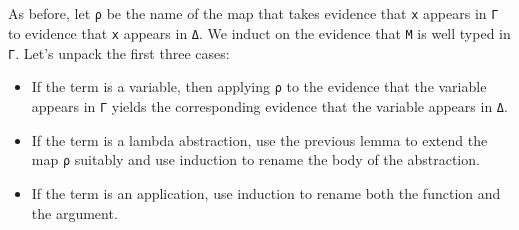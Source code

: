 \begin{fence}
\begin{code}
\>[27]\AgdaSymbol{=}%
\>[30]\AgdaSymbol{(}\AgdaSpace{}%
\AgdaSpace{}%
\AgdaSymbol{)}\AgdaSpace{}%
\AgdaSpace{}%
\AgdaSymbol{(}\AgdaSpace{}%
\AgdaSpace{}%
\AgdaSymbol{)}\<%
\\
\>[0]\AgdaSpace{}%
\AgdaSpace{}%
%
\>[27]\AgdaSymbol{=}%
\>[30]\<%
\\
\>[0]\AgdaSpace{}%
\AgdaSpace{}%
\AgdaSymbol{(}\AgdaSpace{}%
\AgdaSymbol{)}%
\>[27]\AgdaSymbol{=}%
\>[30]\AgdaSpace{}%
\AgdaSymbol{(}\AgdaSpace{}%
\AgdaSpace{}%
\AgdaSymbol{)}\<%
\\
\>[0]\AgdaSpace{}%
\AgdaSpace{}%
\AgdaSymbol{(}\AgdaSpace{}%
\AgdaSpace{}%
\AgdaSpace{}%
\AgdaSymbol{)}%
\>[27]\AgdaSymbol{=}%
\>[30]\AgdaSpace{}%
\AgdaSymbol{(}\AgdaSpace{}%
\AgdaSpace{}%
\AgdaSymbol{)}\AgdaSpace{}%
\AgdaSymbol{(}\AgdaSpace{}%
\AgdaSpace{}%
\AgdaSymbol{)}\AgdaSpace{}%
\AgdaSymbol{(}\AgdaSpace{}%
\AgdaSymbol{(}\AgdaSpace{}%
\AgdaSymbol{)}\AgdaSpace{}%
\AgdaSymbol{)}\<%
\\
\>[0]\AgdaSpace{}%
\AgdaSpace{}%
\AgdaSymbol{(}\AgdaSpace{}%
\AgdaSymbol{)}%
\>[27]\AgdaSymbol{=}%
\>[30]\AgdaSpace{}%
\AgdaSymbol{(}\AgdaSpace{}%
\AgdaSymbol{(}\AgdaSpace{}%
\AgdaSymbol{)}\AgdaSpace{}%
\AgdaSymbol{)}\<%
\end{code}
\end{fence}

As before, let \texttt{ρ} be the name of the map that takes evidence
that \texttt{x} appears in \texttt{Γ} to evidence that \texttt{x}
appears in \texttt{Δ}. We induct on the evidence that \texttt{M} is well
typed in \texttt{Γ}. Let's unpack the first three cases:

\begin{itemize}
\item
  If the term is a variable, then applying \texttt{ρ} to the evidence
  that the variable appears in \texttt{Γ} yields the corresponding
  evidence that the variable appears in \texttt{Δ}.
\item
  If the term is a lambda abstraction, use the previous lemma to extend
  the map \texttt{ρ} suitably and use induction to rename the body of
  the abstraction.
\item
  If the term is an application, use induction to rename both the
  function and the argument.
\end{itemize}

